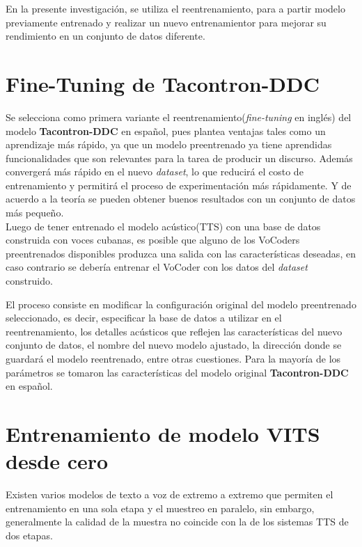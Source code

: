 En la presente investigación, se utiliza el reentrenamiento, para a partir modelo previamente entrenado y realizar un nuevo entrenamientor para mejorar su rendimiento en un conjunto de datos diferente.\\

\section{Fine-Tuning de Tacontron-DDC}

Se selecciona como primera variante el reentrenamiento(\textit{fine-tuning} en inglés) del modelo \textbf{Tacontron-DDC} en español, pues plantea ventajas tales como un aprendizaje más rápido, ya que un modelo preentrenado ya tiene aprendidas funcionalidades que son relevantes para la tarea de producir un discurso. Además convergerá más rápido en el nuevo \textit{dataset}, lo que reducirá el costo de entrenamiento y permitirá el proceso de experimentación más rápidamente. Y de acuerdo a la teoría se pueden obtener buenos resultados con un conjunto de datos más pequeño.\\

Luego de tener entrenado el modelo acústico(TTS) con una base de datos construida con voces cubanas, es posible que alguno de los VoCoders preentrenados disponibles produzca una salida con las características deseadas, en caso contrario se debería entrenar el VoCoder con los datos del \textit{dataset} construido.


El proceso consiste en modificar la configuración original del modelo preentrenado seleccionado, es decir, especificar la base de datos a utilizar en el reentrenamiento, los detalles acústicos que reflejen las características del nuevo conjunto de datos, el nombre del nuevo modelo ajustado, la dirección donde se guardará el modelo reentrenado, entre otras cuestiones. Para la mayoría de los parámetros se tomaron las características del modelo original \textbf{Tacontron-DDC} en español.



\section{Entrenamiento de modelo VITS desde cero}

Existen varios modelos de texto a voz de extremo a extremo que permiten el entrenamiento en una sola etapa y el muestreo en paralelo, sin embargo, generalmente la calidad de la muestra no coincide con la de los sistemas TTS de dos etapas. 

